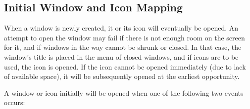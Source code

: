 \subsection{Initial Window and Icon Mapping}

When a window is newly created, it or its icon will eventually be
opened.
An attempt to open the window may fail if there is not enough room on the
screen for it, and if windows in the way cannot be shrunk or closed.
In that case, the window's title is placed in the menu of closed windows,
and if icons are to be used, the icon is opened.
If the icon cannot be opened immediately (due to lack of available
space), it will be subsequently opened at the earliest opportunity.

A window or icon initially will be opened when one of the following two
events occurs:

